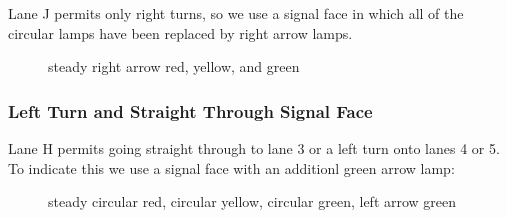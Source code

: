 \documentclass[letterpaper,twoside]{article}
\begin{document}
Lane J permits only right turns, so we use a signal face in which all of
the circular lamps have been replaced by right arrow lamps.

\begin{figure}[H]
           {\caption{steady right arrow red, yellow, and
               green}\label{fig:signal_rrr}}
\end{figure}

\subsubsection{Left Turn and Straight Through Signal Face}

Lane H permits going straight through to lane 3 or a left turn onto lanes
4 or 5.  To indicate this we use a signal face with an additionl green
arrow lamp:

\begin{figure}[H]
           {\caption{steady circular red, circular yellow, circular green,
               left arrow green}\label{fig:signal_cccl}}
\end{figure}
\end{document}
